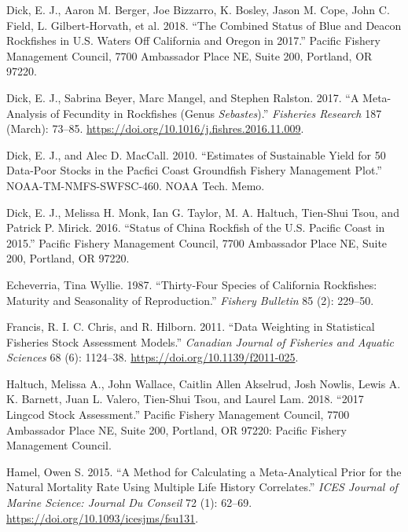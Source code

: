 \documentclass[11pt,
  english,
  a4paper,
]{article}
\begin{document}
\leavevmode\hypertarget{ref-dick_bluedeacon_2018}{}%
Dick, E. J., Aaron M. Berger, Joe Bizzarro, K. Bosley, Jason M. Cope, John C. Field, L. Gilbert-Horvath, et al. 2018. ``The Combined Status of Blue and Deacon Rockfishes in U.S. Waters Off California and Oregon in 2017.'' Pacific Fishery Management Council, 7700 Ambassador Place NE, Suite 200, Portland, OR 97220.

\leavevmode\hypertarget{ref-dick_meta-analysis_2017}{}%
Dick, E. J., Sabrina Beyer, Marc Mangel, and Stephen Ralston. 2017. ``A Meta-Analysis of Fecundity in Rockfishes (Genus \emph{Sebastes}).'' \emph{Fisheries Research} 187 (March): 73--85. \url{https://doi.org/10.1016/j.fishres.2016.11.009}.

\leavevmode\hypertarget{ref-DickandMacCall_dbsra_2010}{}%
Dick, E. J., and Alec D. MacCall. 2010. ``Estimates of Sustainable Yield for 50 Data-Poor Stocks in the Pacfici Coast Groundfish Fishery Management Plot.'' NOAA-TM-NMFS-SWFSC-460. NOAA Tech. Memo.

\leavevmode\hypertarget{ref-dick_china_2016}{}%
Dick, E. J., Melissa H. Monk, Ian G. Taylor, M. A. Haltuch, Tien-Shui Tsou, and Patrick P. Mirick. 2016. ``Status of China Rockfish of the U.S. Pacific Coast in 2015.'' Pacific Fishery Management Council, 7700 Ambassador Place NE, Suite 200, Portland, OR 97220.

\leavevmode\hypertarget{ref-Echeverria_maturity_1987}{}%
Echeverria, Tina Wyllie. 1987. ``Thirty-Four Species of California Rockfishes: Maturity and Seasonality of Reproduction.'' \emph{Fishery Bulletin} 85 (2): 229--50.

\leavevmode\hypertarget{ref-francis_data_2011}{}%
Francis, R. I. C. Chris, and R. Hilborn. 2011. ``Data Weighting in Statistical Fisheries Stock Assessment Models.'' \emph{Canadian Journal of Fisheries and Aquatic Sciences} 68 (6): 1124--38. \url{https://doi.org/10.1139/f2011-025}.

\leavevmode\hypertarget{ref-haltuch_lingcod_2018}{}%
Haltuch, Melissa A., John Wallace, Caitlin Allen Akselrud, Josh Nowlis, Lewis A. K. Barnett, Juan L. Valero, Tien-Shui Tsou, and Laurel Lam. 2018. ``2017 Lingcod Stock Assessment.'' Pacific Fishery Management Council, 7700 Ambassador Place NE, Suite 200, Portland, OR 97220: Pacific Fishery Management Council.

\leavevmode\hypertarget{ref-hamel_method_2015}{}%
Hamel, Owen S. 2015. ``A Method for Calculating a Meta-Analytical Prior for the Natural Mortality Rate Using Multiple Life History Correlates.'' \emph{ICES Journal of Marine Science: Journal Du Conseil} 72 (1): 62--69. \url{https://doi.org/10.1093/icesjms/fsu131}.
\end{document}
